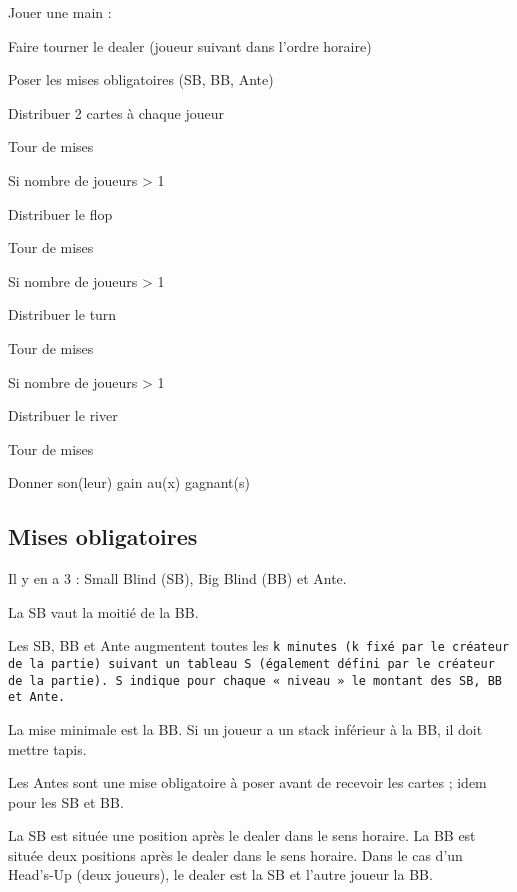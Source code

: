 \documentclass[a4paper]{article}
\begin{document}
\vspace{5mm}
Jouer une main :

Faire tourner le dealer (joueur suivant dans l'ordre horaire)

Poser les mises obligatoires (SB, BB, Ante)

Distribuer 2 cartes à chaque joueur

Tour de mises

Si nombre de joueurs > 1

\hspace{1cm}Distribuer le flop

\hspace{1cm}Tour de mises

\hspace{1cm}Si nombre de joueurs > 1

\hspace{2cm}Distribuer le turn

\hspace{2cm}Tour de mises

\hspace{2cm}Si nombre de joueurs > 1

\hspace{3cm}Distribuer le river

\hspace{3cm}Tour de mises

Donner son(leur) gain au(x) gagnant(s)

\subsection{Mises obligatoires}

Il y en a 3 : Small Blind (SB), Big Blind (BB) et Ante.

La SB vaut la moitié de la BB.

Les SB, BB et Ante augmentent toutes les \tt k \rm minutes (\tt k \rm fixé par le créateur de la partie) suivant un tableau \tt S \rm (également défini par le créateur de la partie).
\tt S \rm indique pour chaque «~niveau~» le montant des SB, BB et Ante.

La mise minimale est la BB.
Si un joueur a un stack inférieur à la BB, il doit mettre tapis.

Les Antes sont une mise obligatoire à poser avant de recevoir les cartes ; idem pour les SB et BB.

La SB est située une position après le dealer dans le sens horaire.
La BB est située deux positions après le dealer dans le sens horaire.
Dans le cas d'un Head's-Up (deux joueurs), le dealer est la SB et l'autre joueur la BB.
\end{document}
